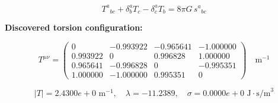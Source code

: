 
\begin{equation}
  T^a{}_{bc} + \delta^a_b T_c - \delta^a_c T_b = 8\pi G \, s^a{}_{bc}
\end{equation}

\textbf{Discovered torsion configuration:}

\begin{equation}
  T^{\mu\nu} = \begin{pmatrix}
    0 & -0.993922 & -0.965641 & -1.000000 \\
    0.993922 & 0 & 0.996828 & 1.000000 \\
    0.965641 & -0.996828 & 0 & -0.995351 \\
    1.000000 & -1.000000 & 0.995351 & 0
  \end{pmatrix} \quad \text{m}^{-1}
\end{equation}

\begin{equation}
  |T| = 2.4300e+0 \text{ m}^{-1}, \quad
  \lambda = -11.2389, \quad
  \sigma = 0.0000e+0 \text{ J}\cdot\text{s/m}^3
\end{equation}